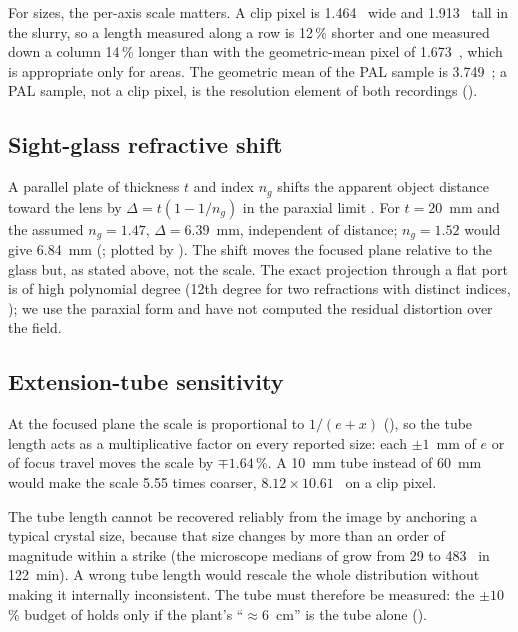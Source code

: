 For sizes, the per-axis scale matters. A clip pixel is 1.464~\um{} wide and 1.913~\um{} tall in the slurry, so a
length measured along a row is 12\,\% shorter and one measured down a column 14\,\% longer than with the
geometric-mean pixel of 1.673~\um, which is appropriate only for areas. The geometric mean of the PAL sample is
3.749~\um; a PAL sample, not a clip pixel, is the resolution element of both recordings ().

\subsection{Sight-glass refractive shift}\label{sec:shift}

A parallel plate of thickness $t$ and index $n_g$ shifts the apparent object distance toward the lens by
$\Delta = t (1 - 1/n_g)$ in the paraxial limit \citep{Hecht2017}. For $t = 20$~mm and the assumed $n_g = 1.47$,
$\Delta = 6.39$~mm, independent of distance; $n_g = 1.52$ would give 6.84~mm
(; plotted by ). The shift moves the focused plane relative to the glass but, as stated
above, not the scale. The exact projection through a flat port is of high polynomial degree (12th degree for two
refractions with distinct indices, \citealp{Agrawal2012}); we use the paraxial form and have not computed the
residual distortion over the field.


\subsection{Extension-tube sensitivity}\label{sec:tube}

At the focused plane the scale is proportional to $1/(e + x)$ (), so the tube length acts as a
multiplicative factor on every reported size: each $\pm 1$~mm of $e$ or of focus travel moves the scale by
$\mp 1.64$\,\%. A 10~mm tube instead of
60~mm would make the scale 5.55 times coarser, $8.12 \times 10.61$~\umpx{} on a clip pixel.

The tube length cannot be recovered reliably from the image by anchoring a typical crystal size, because that size
changes by more than an order of magnitude within a strike (the microscope medians of  grow from
29 to 483~\um{} in 122~min). A wrong tube length would rescale the whole distribution without making it
internally inconsistent. The tube must therefore be measured: the $\pm 10$\,\% budget of  holds only if the
plant's ``$\approx 6$~cm'' is the tube alone ().
